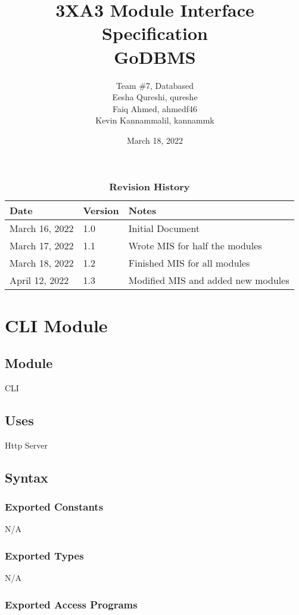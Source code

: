 \documentclass[12pt]{article}
\title{3XA3 Module Interface Specification\\ GoDBMS}
\author{Team \#7, Databased
    \\ Eesha Qureshi, qureshe
    \\ Faiq Ahmed, ahmedf46
    \\ Kevin Kannammalil, kannammk}
\date{March 18, 2022}
\begin{document}
 
\maketitle
\newpage
\tableofcontents
\listoftables
\listoffigures

\newpage
\begin{table}[h]
\caption{\bf Revision History}
\begin{tabularx}{\textwidth}{p{3cm}p{2cm}X}
\toprule {\bf Date} & {\bf Version} & {\bf Notes}\\
\midrule
March 16, 2022 & 1.0 & Initial Document\\
March 17, 2022 & 1.1 & Wrote MIS for half the modules\\
March 18, 2022 & 1.2 & Finished MIS for all modules\\
{\color{red}April 12, 2022} & {\color{red}1.3} & {\color{red}Modified MIS and added new modules}\\
\bottomrule
\end{tabularx}
\end{table}

\newpage

\section {CLI Module}

\subsection{Module}
CLI

\subsection {Uses}
Http Server

\subsection {Syntax}

\subsubsection {Exported Constants}
N/A
\subsubsection {Exported Types}
N/A
\subsubsection {Exported Access Programs}
\end{document}
